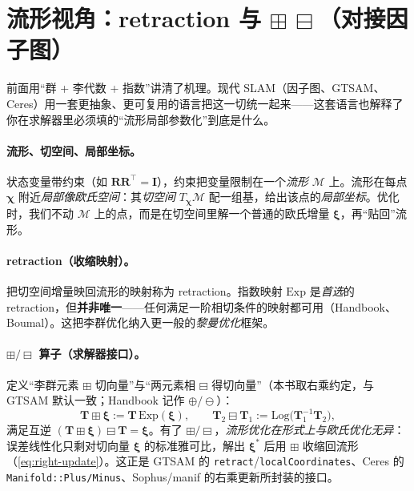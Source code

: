 \section{流形视角：retraction 与 \texorpdfstring{$\boxplus\,\boxminus$}{boxplus/boxminus}（对接因子图）}
\label{sec:manifold}

前面用“群 + 李代数 + 指数”讲清了机理。现代 SLAM（因子图、GTSAM、Ceres）用一套更抽象、更可复用的语言把这一切统一起来——这套语言也解释了你在求解器里必须填的“流形局部参数化”到底是什么\cite{carlone2026handbook,hertzberg2013integrating}。

\paragraph{流形、切空间、局部坐标。}状态变量带约束（如 $\mathbf{R}\mathbf{R}^\top=\mathbf{I}$），约束把变量限制在一个\emph{流形} $\mathcal{M}$ 上。流形在每点 $\boldsymbol{\chi}$ 附近\emph{局部像欧氏空间}：其\emph{切空间} $T_{\boldsymbol{\chi}}\mathcal{M}$ 配一组基，给出该点的\emph{局部坐标}。优化时，我们不动 $\mathcal{M}$ 上的点，而是在切空间里解一个普通的欧氏增量 $\boldsymbol{\xi}$，再“贴回”流形。

\paragraph{retraction（收缩映射）。}把切空间增量映回流形的映射称为 retraction。指数映射 $\mathrm{Exp}$ 是\emph{首选}的 retraction，但\textbf{并非唯一}——任何满足一阶相切条件的映射都可用（Handbook、Boumal）。这把李群优化纳入更一般的\emph{黎曼优化}框架。

\paragraph{$\boxplus/\boxminus$ 算子（求解器接口）。}定义“李群元素 $\boxplus$ 切向量”与“两元素相 $\boxminus$ 得切向量”（本书取右乘约定，与 GTSAM 默认一致；Handbook 记作 $\oplus/\ominus$）：
\begin{equation}
  \mathbf{T}\boxplus\boldsymbol{\xi}:=\mathbf{T}\,\mathrm{Exp}(\boldsymbol{\xi}),\qquad
  \mathbf{T}_2\boxminus\mathbf{T}_1:=\mathrm{Log}\big(\mathbf{T}_1^{-1}\mathbf{T}_2\big),
  \label{eq:boxplus}
\end{equation}
满足互逆 $(\mathbf{T}\boxplus\boldsymbol{\xi})\boxminus\mathbf{T}=\boldsymbol{\xi}$。有了 $\boxplus/\boxminus$，\emph{流形优化在形式上与欧氏优化无异}：误差线性化只剩对切向量 $\boldsymbol{\xi}$ 的标准雅可比，解出 $\boldsymbol{\xi}^*$ 后用 $\boxplus$ 收缩回流形（\cref{eq:right-update}）。这正是 GTSAM 的 \texttt{retract}/\allowbreak\texttt{localCoordinates}、Ceres 的 \texttt{Manifold::Plus/\allowbreak Minus}、Sophus/manif 的右乘更新所封装的接口。

